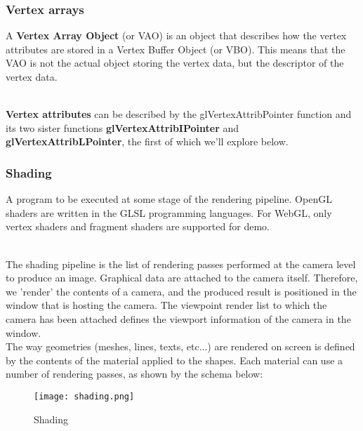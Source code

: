 \documentclass[onecolumn]{article}
\begin{document}
\subsubsection{Vertex arrays }\label{sec:1.0.2}
\begin{story}[VAO]
A \textbf{Vertex Array Object} (or VAO) is an object that describes how the vertex attributes are stored in a Vertex Buffer Object (or VBO). This means that the VAO is not the actual object storing the vertex data, but the descriptor of the vertex data. 
\end{story}
\\\textbf{Vertex attributes }can be described by the glVertexAttribPointer function and its two sister functions \textbf{glVertexAttribIPointer} and \textbf{glVertexAttribLPointer}, the first of which we’ll explore below.



\subsubsection{Shading }\label{sec:1.0.3}

\begin{story}[shader]
A program to be executed at some stage of the rendering pipeline. OpenGL shaders are written in the GLSL programming languages. For WebGL, only vertex shaders and fragment shaders are supported \marginnote{ } for demo.
\end{story}
\\
The shading pipeline is the list of rendering passes performed at the camera level to produce an image. Graphical data are attached to the camera itself. Therefore, we 'render' the contents of a camera, and the produced result is positioned in the window that is hosting the camera. The viewpoint render list to which the camera has been attached defines the viewport information of the camera in the window.\\

The way geometries (meshes, lines, texts, etc...) are rendered on screen is defined by the contents of the material applied to the shapes. Each material can use a number of rendering passes, as shown by the schema below:



\begin{figure}[ht!]
\centering
\texttt{[image: shading.png]}
\caption{Shading \label{}}
\end{figure}

\\\\
\end{document}
